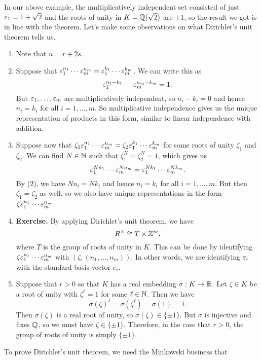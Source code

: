 In our above example, the multiplicatively independent set consisted 
of just $\varepsilon_1 = 1 + \sqrt{2}$ and the roots of unity in 
$K = \mathbb{Q}(\sqrt{2})$ are $\pm 1$, so the result we got is in line with 
the theorem. 
\newpage
Let's make some observations on what Dirichlet's unit theorem tells us.
\begin{enumerate}[(1)]
    \item Note that $n = r + 2s$. 
    \item Suppose that $\varepsilon_1^{n_1} \cdots \varepsilon_m^{n_m} = \varepsilon_1^{k_1} 
    \cdots \varepsilon_m^{k_m}$. We can write this as 
    \[ \varepsilon_1^{n_1-k_1} \cdots \varepsilon_m^{n_m-k_m} = 1. \] 
    But $\varepsilon_1, \dots, \varepsilon_m$ are multiplicatively independent, 
    so $n_i - k_i = 0$ and hence $n_i = k_i$ for all $i = 1, \dots, m$. 
    So multiplicative independence gives us the unique representation 
    of products in this form, similar to linear independence with addition.
    \item Suppose now that $\zeta_1 \varepsilon_1^{n_1} \cdots \varepsilon_m^{n_m} 
    = \zeta_2 \varepsilon_1^{k_1} \cdots \varepsilon_m^{k_m}$ for some roots of 
    unity $\zeta_1$ and $\zeta_2$. We can find $N \in \mathbb{N}$ such that 
    $\zeta_1^N = \zeta_2^N = 1$, which gives us 
    \[ \varepsilon_1^{Nn_1} \cdots \varepsilon_m^{Nn_m} = \varepsilon_1^{Nk_1} \cdots \varepsilon_m^{Nk_m}. \] 
    By (2), we have $Nn_i = Nk_i$ and hence $n_i = k_i$ for all $i = 1, \dots, m$. 
    But then $\zeta_1 = \zeta_2$ as well, so we also have unique representations 
    in the form $\zeta\varepsilon_1^{n_1} \cdots \varepsilon_m^{n_m}$. 
    \item {\bf Exercise.} By applying Dirichlet's unit theorem, we have 
    \[ R^\times \cong T \times \mathbb{Z}^m, \] 
    where $T$ is the group of roots of unity in $K$.
    This can be done by identifying $\zeta\varepsilon_1^{n_1} \cdots \varepsilon_m^{n_m}$ 
    with $(\zeta, (n_1, \dots, n_m))$. In other words, we are identifying
    $\varepsilon_i$ with the standard basis vector $e_i$. 
    \item Suppose that $r > 0$ so that $K$ has a real embedding $\sigma : K \to \mathbb{R}$. 
    Let $\zeta \in K$ be a root of unity with $\zeta^\ell = 1$ for some 
    $\ell \in \mathbb{N}$. Then we have 
    \[ \sigma(\zeta)^\ell = \sigma(\zeta^\ell) = \sigma(1) = 1. \] 
    Then $\sigma(\zeta)$ is a real root of unity, so $\sigma(\zeta) \in \{\pm1\}$. 
    But $\sigma$ is injective and fixes $\mathbb{Q}$, so we must have $\zeta \in \{\pm1\}$.
    Therefore, in the case that $r > 0$, the group of roots of unity 
    is simply $\{\pm1\}$.
\end{enumerate}
To prove Dirichlet's unit theorem, we need the Minkowski business that 
